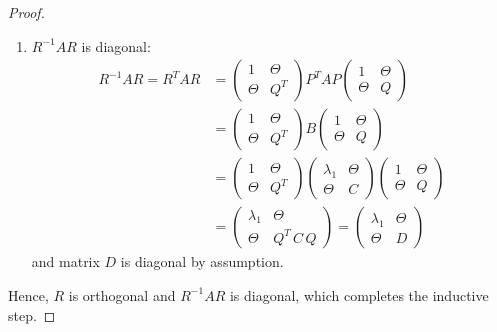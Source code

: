 \begin{proof}
\begin{enumerate}
\begin{align*}
\begin{array}{c|c}
        {\Theta} & I
        \end{array}
        \right) = I.
    \end{align*}
    \item $R^{-1}AR$ is diagonal: 
    \begin{align*}
    R^{-1}AR = R^TAR 
    & = 
     \left(
        \begin{array}{c|c}
        1 & {\Theta} \\ \hline
        {\Theta} & Q^T
        \end{array}
    \right)
     P^T A P
     \left(
        \begin{array}{c|c}
        1 & {\Theta} \\ \hline
        {\Theta} & Q
        \end{array}
    \right)
     \\
     & = \left(
        \begin{array}{c|c}
        1 & {\Theta} \\ \hline
        {\Theta} & Q^T
        \end{array}
     \right)
     B
     \left(
        \begin{array}{c|c}
        1 & {\Theta} \\ \hline
        {\Theta} & Q
        \end{array}
     \right) \\
     & = \left(
        \begin{array}{c|c}
        1 & {\Theta} \\ \hline
        {\Theta} & Q^T
        \end{array}
     \right)
     \left(
        \begin{array}{c|c}
        \lambda_1 & {\Theta} \\ \hline
        {\Theta} & C
        \end{array}
     \right)
     \left(
        \begin{array}{c|c}
        1 & {\Theta} \\ \hline
        {\Theta} & Q
        \end{array}
     \right)\\
     & = \left(
        \begin{array}{c|c}
        \lambda_1 & {\Theta} \\ \hline
        {\Theta} & Q^T\,C\,Q
        \end{array}
     \right)
     =
     \left(
        \begin{array}{c|c}
        \lambda_1 & {\Theta} \\ \hline
        {\Theta} & D
        \end{array}
     \right)
    \end{align*}
    and matrix $D$ is diagonal by assumption.
\end{enumerate}
Hence, $R$ is orthogonal and $R^{-1}AR$ is diagonal, which completes the inductive step.
\end{proof}

